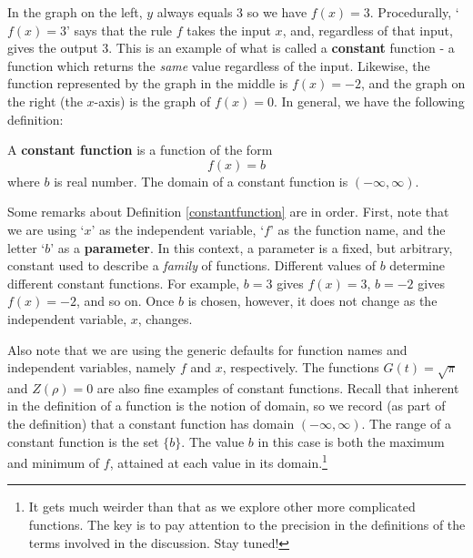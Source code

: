 In the graph on the left, $y$ always equals $3$ so we have $f(x) = 3$.  Procedurally, `$f(x) = 3$' says that the rule $f$ takes the input $x$, and, regardless of that input, gives the output $3$.  This is an example of what is called a \textbf{constant} function - a function which returns the \textit{same} value regardless of the input.  Likewise, the function represented by the graph in the middle is $f(x) = -2$, and the graph on the right (the $x$-axis) is the graph of $f(x) = 0$.  In general, we have the following definition:

\medskip

\colorbox{ResultColor}{\bbm

\begin{defn} \label{constantfunction} 
A \textbf{constant function} is a function of the form \[ f(x) =  b\] where $b$ is real number.  The domain of a constant function is $(-\infty, \infty)$.

\end{defn}

\ebm}

\medskip

Some remarks about  Definition \ref{constantfunction} are in order.   First, note that we are using `$x$' as the independent variable, `$f$' as the function name, and  the letter `$b$' as a  \textbf{parameter}.  In this context, a parameter is a fixed, but arbitrary, constant used to describe a \textit{family} of functions.  Different values of $b$ determine different constant functions.  For example, $b = 3$ gives $f(x) = 3$, $b = -2$ gives $f(x) = -2$, and so on.  Once $b$ is chosen, however, it does not change as the independent variable, $x$, changes.   

\medskip

Also note that we are using the generic defaults for function names and independent variables, namely $f$ and $x$, respectively.   The functions  $G(t) = \sqrt{\pi}$ and $Z(\rho) = 0$ are also fine examples of constant functions.  Recall that inherent in the definition of a function is the notion of domain, so we record (as part of the definition) that a constant function has domain $(-\infty, \infty)$.  The range of a constant function is the set $\{b \}$.  The value $b$ in this case is both the maximum and minimum of $f$, attained at each value in its domain.\footnote{It gets much weirder than that as we explore other more complicated functions.  The key is to pay attention to the precision in the definitions of the terms involved in the discussion. Stay tuned!}\label{rangeofconstantismaxandmin}

